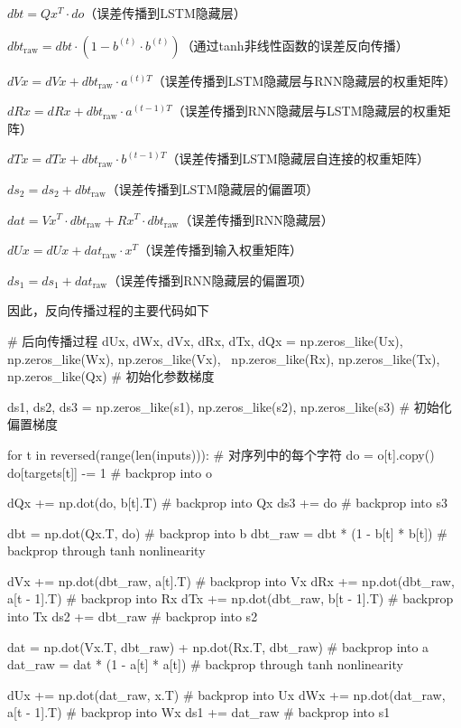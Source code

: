 \documentclass[letterpaper,12pt]{article}
\begin{document}
	$dbt = Qx^T \cdot do$（误差传播到LSTM隐藏层）
	
	$dbt_{\text{raw}} = dbt \cdot (1 - b^{(t)} \cdot b^{(t)})$（通过tanh非线性函数的误差反向传播）
	
	$dVx = dVx + dbt_{\text{raw}} \cdot a^{(t)T}$（误差传播到LSTM隐藏层与RNN隐藏层的权重矩阵）
	
	$dRx = dRx + dbt_{\text{raw}} \cdot a^{(t-1)T}$（误差传播到RNN隐藏层与LSTM隐藏层的权重矩阵）
	
	$dTx = dTx + dbt_{\text{raw}} \cdot b^{(t-1)T}$（误差传播到LSTM隐藏层自连接的权重矩阵）
	
	$ds_2 = ds_2 + dbt_{\text{raw}}$（误差传播到LSTM隐藏层的偏置项）
	
	$dat = Vx^T \cdot dbt_{\text{raw}} + Rx^T \cdot dbt_{\text{raw}}$（误差传播到RNN隐藏层）
	
	$dUx = dUx + dat_{\text{raw}} \cdot x^T$（误差传播到输入权重矩阵）
	
	$ds_1 = ds_1 + dat_{\text{raw}}$（误差传播到RNN隐藏层的偏置项）
	
	
	因此，反向传播过程的主要代码如下
	
	\begin{python}
		# 后向传播过程
		dUx, dWx, dVx, dRx, dTx, dQx = np.zeros_like(Ux), np.zeros_like(Wx), np.zeros_like(Vx), \
		np.zeros_like(Rx), np.zeros_like(Tx), np.zeros_like(Qx)  # 初始化参数梯度
		
		ds1, ds2, ds3 = np.zeros_like(s1), np.zeros_like(s2), np.zeros_like(s3)  # 初始化偏置梯度
		
		for t in reversed(range(len(inputs))):  # 对序列中的每个字符
			do = o[t].copy()
			do[targets[t]] -= 1  # backprop into o
			
			dQx += np.dot(do, b[t].T)  # backprop into Qx
			ds3 += do  # backprop into s3
			
			dbt = np.dot(Qx.T, do)  # backprop into b
			dbt_raw = dbt * (1 - b[t] * b[t])  # backprop through tanh nonlinearity
			
			dVx += np.dot(dbt_raw, a[t].T)  # backprop into Vx
			dRx += np.dot(dbt_raw, a[t - 1].T)  # backprop into Rx
			dTx += np.dot(dbt_raw, b[t - 1].T)  # backprop into Tx
			ds2 += dbt_raw  # backprop into s2
			
			dat = np.dot(Vx.T, dbt_raw) + np.dot(Rx.T, dbt_raw)  # backprop into a
			dat_raw = dat * (1 - a[t] * a[t])  # backprop through tanh nonlinearity
			
			dUx += np.dot(dat_raw, x.T)  # backprop into Ux
			dWx += np.dot(dat_raw, a[t - 1].T)  # backprop into Wx
			ds1 += dat_raw  # backprop into s1
	\end{python}
	
\end{document}

